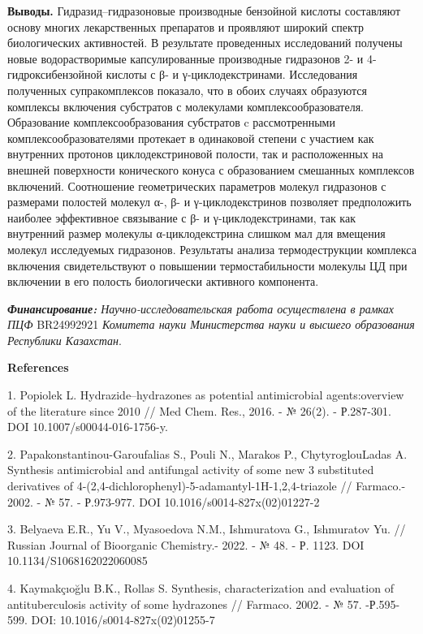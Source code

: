 {\bfseries Выводы.} Гидразид--гидразоновые производные бензойной кислоты
составляют основу многих лекарственных препаратов и проявляют широкий
спектр биологических активностей. В результате проведенных исследований
получены новые водорастворимые капсулированные производные гидразонов 2-
и 4-гидроксибензойной кислоты с β- и γ-циклодекстринами. Исследования
полученных супракомплексов показало, что в обоих случаях образуются
комплексы включения субстратов с молекулами комплексообразователя.
Образование комплексообразования субстратов c рассмотренными
комплексообразователями протекает в одинаковой степени с участием как
внутренних протонов циклодекстриновой полости, так и расположенных на
внешней поверхности конического конуса с образованием смешанных
комплексов включений. Соотношение геометрических параметров молекул
гидразонов с размерами полостей молекул α-, β- и γ-циклодекстринов
позволяет предположить наиболее эффективное связывание с β- и
γ-циклодекстринами, так как внутренний размер молекулы α-циклодекстрина
слишком мал для вмещения молекул исследуемых гидразонов. Результаты
анализа термодеструкции комплекса включения свидетельствуют о повышении
термостабильности молекулы ЦД при включении в его полость биологически
активного компонента.

\emph{{\bfseries Финансирование:} Научно-исследовательская работа
осуществлена в рамках ПЦФ} BR24992921 \emph{Комитета науки Министерства
науки и высшего образования Республики Казахстан}.

{\bfseries References}

1. Popiolek L. Hydrazide--hydrazones as potential antimicrobial
agents:overview of the literature since 2010 // Med Chem. Res., 2016. -
№ 26(2). - Р.287-301. DOI 10.1007/s00044-016-1756-y.

2. Papakonstantinou-Garoufalias S., Pouli N., Marakos P.,
ChytyroglouLadas A. Synthesis antimicrobial and antifungal activity of
some new 3 substituted derivatives of
4-(2,4-dichlorophenyl)-5-adamantyl-1H-1,2,4-triazole // Farmaco.- 2002.
- № 57. - Р.973-977. DOI 10.1016/s0014-827x(02)01227-2

3. Belyaeva E.R., Yu V., Myasoedova N.M., Ishmuratova G., Ishmuratov Yu.
// Russian Journal of Bioorganic Chemistry.- 2022. - № 48. - Р.
1123. DOI 10.1134/S1068162022060085

4. Kaymakçıoğlu B.K., Rollas S. Synthesis, characterization and
evaluation of antituberculosis activity of some hydrazones // Farmaco.
2002. - № 57. -Р.595-599. DOI: 10.1016/s0014-827x(02)01255-7

